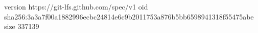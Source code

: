 version https://git-lfs.github.com/spec/v1
oid sha256:3a3a7f00a1882996ecbc24814e6c9b2011753a876b5bb6598941318f55475abe
size 337139
